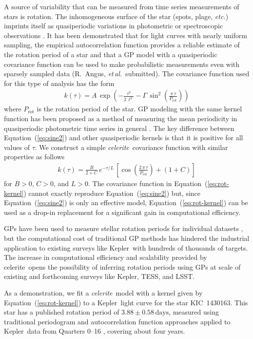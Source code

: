 \documentclass[manuscript, letterpaper]{aastex6}
\newcommand{\project}[1]{\textsf{#1}}
\newcommand{\kepler}{\project{Kepler}}
\newcommand{\lsst}{\project{LSST}}
\newcommand{\tess}{\project{TESS}}
\newcommand{\celerite}{\project{celerite}}
\newcommand{\celeriteterm}{\emph{celerite}}
\newcommand{\foreign}[1]{\emph{#1}}
\newcommand{\etal}{\foreign{et\,al.}}
\newcommand{\etc}{\foreign{etc.}}
\renewcommand{\eqref}[1]{\ref{eq:#1}}
\newcommand{\Eq}[1]{Equation~(\eqref{#1})}
\newcommand{\eq}[1]{\Eq{#1}}
\newcommand{\eqlabel}[1]{\label{eq:#1}}
\newcommand{\response}[1]{{\color{blue}#1}}
\begin{document}
A source of variability that can be measured from time series measurements of
stars is rotation.
The inhomogeneous surface of the star (spots, plage, \etc) imprints itself as
quasiperiodic variations in photometric or spectroscopic observations
\citep{Dumusque:2014}.
It has been demonstrated that for light curves with nearly uniform sampling,
the empirical autocorrelation function provides a reliable estimate of the
rotation period of a star \citep{Mcquillan:2013, Mcquillan:2014, Aigrain:2015}
and that a GP model with a
quasiperiodic covariance function can be used to make probabilistic
measurements even with sparsely sampled data (R.~Angus, \etal\ submitted).
The covariance function used for this type of analysis has the form
\begin{eqnarray}\eqlabel{sine2}
k(\tau) = A\,\exp\left(-\frac{\tau^2}{2\,\ell^2} -
    \Gamma\,\sin^2\left(\frac{\pi\,\tau}{P_\mathrm{rot}} \right) \right)
\end{eqnarray}
where $P_\mathrm{rot}$ is the rotation period of the star.
GP modeling with the same kernel function has been proposed as a method of
measuring the mean periodicity in quasiperiodic photometric time series in
general \citep{Wang:2012}.
The key difference between \eq{sine2} and other quasiperiodic kernels is that
it is positive for all values of $\tau$.
We construct a simple \celeriteterm\ covariance function with similar
properties as follows
\begin{eqnarray}\eqlabel{rot-kernel}
k(\tau) = \frac{B}{2+C}\,e^{-\tau/L}\,\left[
    \cos\left(\frac{2\,\pi\,\tau}{P_\mathrm{rot}}\right) + (1 + C)
\right]
\end{eqnarray}
for $B>0$, $C>0$, and $L>0$.
The covariance function in \eq{rot-kernel} cannot exactly reproduce \eq{sine2}
but, since \eq{sine2} is only an effective model, \eq{rot-kernel} can be used
as a drop-in replacement for a significant gain in computational efficiency.

\response{GPs have been used to measure stellar rotation periods for
individual datasets \citep[for example][]{Littlefair:2017}, but the
computational cost of traditional GP methods has hindered the industrial
application to existing surveys like \kepler\ with hundreds of thousands of
targets.
The increase in computational efficiency and scalability provided by
\celerite\ opens the possibility of inferring rotation periods using GPs at
scale of existing and forthcoming surveys like \kepler, \tess, and \lsst.
}

As a demonstration, we fit a \celeriteterm\ model with a kernel given
by \eq{rot-kernel} to a \kepler\ light curve for the star KIC~1430163.
This star has a published rotation period of $3.88 \pm 0.58\,\mathrm{days}$,
measured using traditional periodogram and autocorrelation function approaches
applied to \kepler\ data from Quarters 0--16 \citep{Mathur:2014}, covering
about four years.
\end{document}
